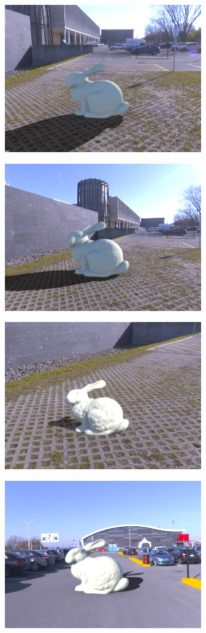 \begin{minipage}{\linewidth}
\begin{multicols}{4}
\includegraphics[width=\mywidth]{AG8A2917_Panorama_hdr-corrected_009.jpg}

\includegraphics[width=\mywidth]{AG8A2917_Panorama_hdr-corrected_010.jpg}

\includegraphics[width=\mywidth]{AG8A2917_Panorama_hdr-corrected_012.jpg}

\includegraphics[width=\mywidth]{AG8A2959_Panorama_hdr-corrected_009.jpg}


\end{multicols}
\end{minipage}
